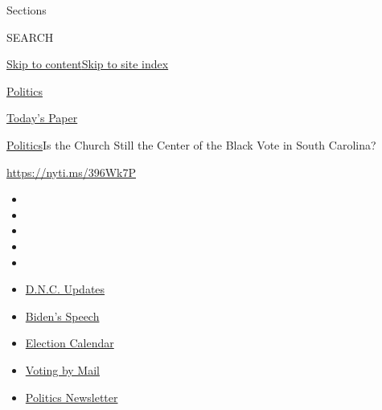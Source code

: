Sections

SEARCH

\protect\hyperlink{site-content}{Skip to
content}\protect\hyperlink{site-index}{Skip to site index}

\href{https://www.nytimes3xbfgragh.onion/section/politics}{Politics}

\href{https://myaccount.nytimes3xbfgragh.onion/auth/login?response_type=cookie\&client_id=vi}{}

\href{https://www.nytimes3xbfgragh.onion/section/todayspaper}{Today's
Paper}

\href{/section/politics}{Politics}\textbar{}Is the Church Still the
Center of the Black Vote in South Carolina?

\url{https://nyti.ms/396Wk7P}

\begin{itemize}
\item
\item
\item
\item
\item
\end{itemize}

\begin{itemize}
\item
  \href{https://www.nytimes3xbfgragh.onion/live/2020/08/20/us/dnc-convention-election?action=click\&pgtype=Article\&state=default\&region=TOP_BANNER\&context=storylines_menu}{D.N.C.
  Updates}
\item
  \href{https://www.nytimes3xbfgragh.onion/2020/08/20/us/politics/biden-presidential-nomination-dnc.html?action=click\&pgtype=Article\&state=default\&region=TOP_BANNER\&context=storylines_menu}{Biden's
  Speech}
\item
  \href{https://www.nytimes3xbfgragh.onion/interactive/2019/us/elections/2020-presidential-election-calendar.html?action=click\&pgtype=Article\&state=default\&region=TOP_BANNER\&context=storylines_menu}{Election
  Calendar}
\item
  \href{https://www.nytimes3xbfgragh.onion/interactive/2020/08/11/us/politics/vote-by-mail-us-states.html?action=click\&pgtype=Article\&state=default\&region=TOP_BANNER\&context=storylines_menu}{Voting
  by Mail}
\item
  \href{https://www.nytimes3xbfgragh.onion/newsletters/politics?action=click\&pgtype=Article\&state=default\&region=TOP_BANNER\&context=storylines_menu}{Politics
  Newsletter}
\end{itemize}

